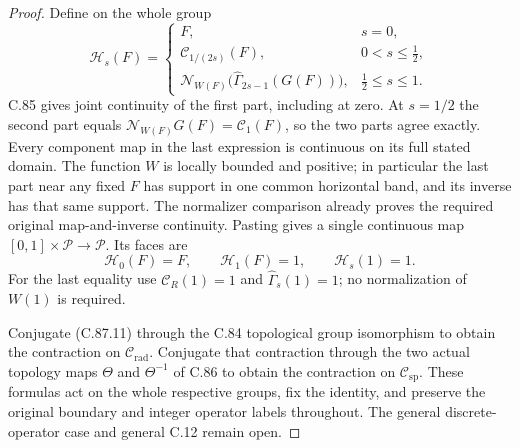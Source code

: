 \begin{proof}
Define on the whole group
\[
 \mathcal H_s(F)=
 \begin{cases}
  F,&s=0,\\
  \mathcal C_{1/(2s)}(F),&0<s\leq\tfrac12,\\
  \mathcal N_{W(F)}
    \bigl(\widehat\Gamma_{2s-1}(G(F))\bigr),
       &\tfrac12\leq s\leq1.
 \end{cases}                                                     \tag{C.87.11}
\]
C.85 gives joint continuity
of the first part, including
at zero. At $s=1/2$ the second
part equals
$\mathcal N_{W(F)}G(F)=\mathcal C_1(F)$,
so the two parts agree exactly.
Every component map in the
last expression is continuous
on its full stated domain.
The function $W$ is locally
bounded and positive; in
particular the last part near
any fixed $F$ has support in
one common horizontal band,
and its inverse has that
same support. The normalizer
comparison already proves
the required original
map-and-inverse continuity.
Pasting gives a single
continuous map
$[0,1]\times\mathscr P\to\mathscr P$.
Its faces are
\[
 \mathcal H_0(F)=F,\qquad
 \mathcal H_1(F)=1,\qquad
 \mathcal H_s(1)=1.
                                                               \tag{C.87.12}
\]
For the last equality use
$\mathcal C_R(1)=1$ and
$\widehat\Gamma_s(1)=1$;
no normalization of $W(1)$
is required.

Conjugate (C.87.11) through
the C.84 topological group
isomorphism to obtain the
contraction on
$\mathscr C_{\mathrm{rad}}$.
Conjugate that contraction
through the two actual
topology maps $\Theta$ and
$\Theta^{-1}$ of C.86 to
obtain the contraction on
$\mathscr C_{\mathrm{sp}}$.
These formulas act on the
whole respective groups,
fix the identity, and
preserve the original
boundary and integer
operator labels throughout.
The general discrete-operator
case and general C.12 remain
open.
\end{proof}
